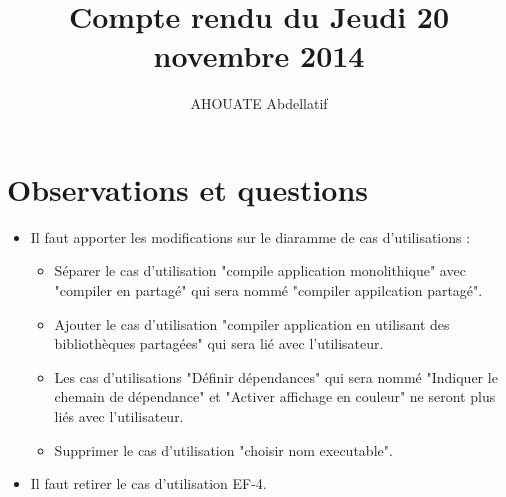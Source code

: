 \documentclass{../../../../../res/rapport}
\author{AHOUATE Abdellatif}
\title{Compte rendu du Jeudi 20 novembre 2014}
\begin{document}
    \maketitle
    \tableofcontents
    \clearpage
    
    \section{Observations et questions} 
    \label{sec:observations_et_questions}
        \begin{itemize}
            \item Il faut apporter les modifications sur le diaramme de cas d'utilisations :
                  \begin{itemize}
                      \item Séparer le cas d'utilisation "compile application monolithique" avec "compiler en partagé"
                      qui sera nommé "compiler appilcation partagé".

                      \item Ajouter le cas d'utilisation "compiler application en utilisant des bibliothèques partagées" qui sera lié avec l'utilisateur.
                      \item Les cas d'utilisations "Définir dépendances" qui sera nommé "Indiquer le chemain de dépendance" et "Activer affichage en couleur" ne seront plus liés avec l'utilisateur.
                      \item Supprimer le cas d'utilisation "choisir nom executable".\\
                  \end{itemize}

            \item Il faut retirer le cas d'utilisation EF-4.\\


\end{itemize}
\end{document}
